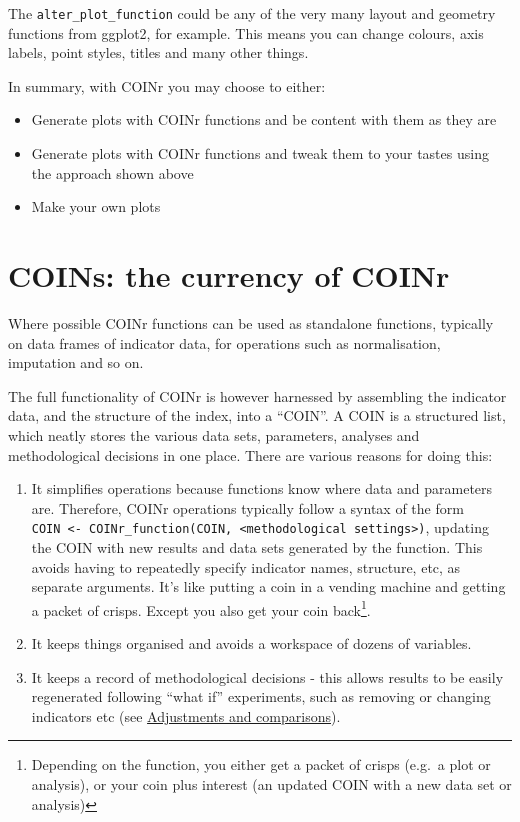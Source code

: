 \documentclass[
]{book}
\providecommand{\tightlist}{%
  \setlength{\itemsep}{0pt}\setlength{\parskip}{0pt}}
\begin{document}
The \texttt{alter\_plot\_function} could be any of the very many layout and geometry functions from ggplot2, for example. This means you can change colours, axis labels, point styles, titles and many other things.

In summary, with COINr you may choose to either:

\begin{itemize}
\tightlist
\item
  Generate plots with COINr functions and be content with them as they are
\item
  Generate plots with COINr functions and tweak them to your tastes using the approach shown above
\item
  Make your own plots
\end{itemize}

\hypertarget{coins-the-currency-of-coinr}{%
\chapter{COINs: the currency of COINr}\label{coins-the-currency-of-coinr}}

Where possible COINr functions can be used as standalone functions, typically on data frames of indicator data, for operations such as normalisation, imputation and so on.

The full functionality of COINr is however harnessed by assembling the indicator data, and the structure of the index, into a ``COIN''. A COIN is a structured list, which neatly stores the various data sets, parameters, analyses and methodological decisions in one place. There are various reasons for doing this:

\begin{enumerate}
\def\labelenumi{\arabic{enumi}.}
\tightlist
\item
  It simplifies operations because functions know where data and parameters are. Therefore, COINr operations typically follow a syntax of the form \texttt{COIN\ \textless{}-\ COINr\_function(COIN,\ \textless{}methodological\ settings\textgreater{})}, updating the COIN with new results and data sets generated by the function. This avoids having to repeatedly specify indicator names, structure, etc, as separate arguments. It's like putting a coin in a vending machine and getting a packet of crisps. Except you also get your coin back\footnote{Depending on the function, you either get a packet of crisps (e.g.~a plot or analysis), or your coin plus interest (an updated COIN with a new data set or analysis)}.
\item
  It keeps things organised and avoids a workspace of dozens of variables.
\item
  It keeps a record of methodological decisions - this allows results to be easily regenerated following ``what if'' experiments, such as removing or changing indicators etc (see \protect\hyperlink{adjustments-and-comparisons}{Adjustments and comparisons}).
\end{enumerate}
\end{document}
